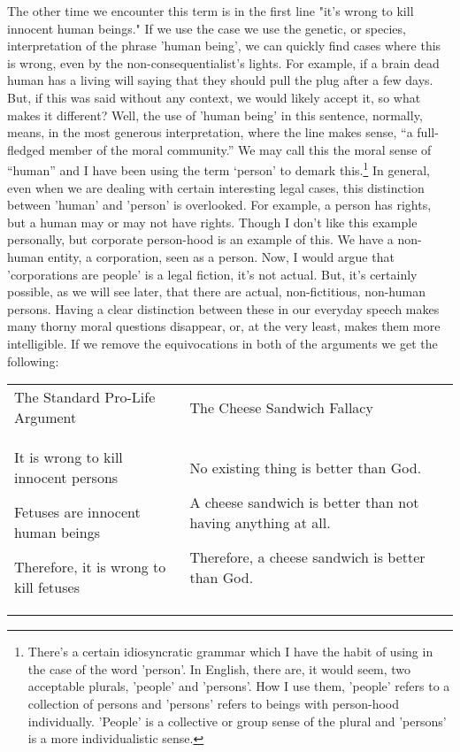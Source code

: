 The other time we encounter this term is in the first line "it's wrong to kill innocent human beings." If we use the case we use the genetic, or species, interpretation of the phrase 'human being', we can quickly find cases where this is wrong, even by the non-consequentialist's lights. For example, if a brain dead human has a living will saying that they should pull the plug after a few days. But, if this was said without any context, we would likely accept it, so what makes it different? Well, the use of 'human being' in this sentence, normally, means, in the most generous interpretation, where the line makes sense,  “a full-fledged member of the moral community.” We may call this the moral sense of “human” and I have been using the term ‘person’ to demark this.\footnote{There's a certain idiosyncratic grammar which I have the habit of using in the case of the word 'person'. In English, there are, it would seem, two acceptable plurals, 'people' and 'persons'. How I use them, 'people' refers to a collection of persons and 'persons' refers to beings with person-hood individually. 'People' is a collective or group sense of the plural and 'persons' is a more individualistic sense.} In general, even when we are dealing with certain interesting legal cases, this distinction between 'human' and 'person' is overlooked. For example, a person has rights, but a human may or may not have rights. Though I don't like this example personally, but corporate person-hood is an example of this. We have a non-human entity, a corporation, seen as a person. Now, I would argue that 'corporations are people' is a legal fiction, it's not actual. But, it's certainly possible, as we will see later, that there are actual, non-fictitious, non-human persons. Having a clear distinction between these in our everyday speech makes many thorny moral questions disappear, or, at the very least, makes them more intelligible. If we remove the equivocations in both of the arguments we get the following:

\begin{tabular}{p{2in}|p{2in}}
The Standard Pro-Life Argument&The Cheese Sandwich Fallacy\\
\begin{earg}
    \item[] It is wrong to kill innocent persons
    \item[] Fetuses are innocent human beings
    \item[] Therefore, it is wrong to kill fetuses
\end{earg}&
\begin{earg}
    \item[] No existing thing is better than God.
    \item[] A cheese sandwich is better than not having anything at all.
    \item[] Therefore, a cheese sandwich is better than God. 
\end{earg}
\end{tabular}


